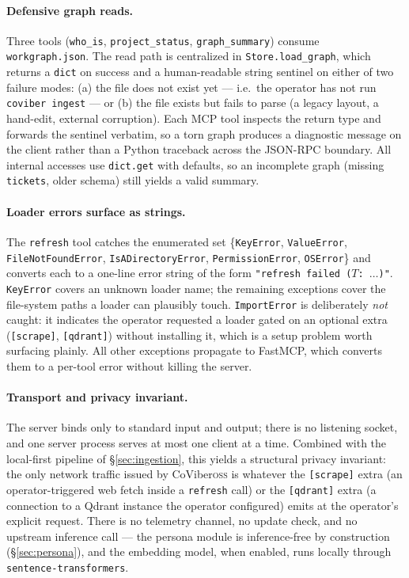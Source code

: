 \paragraph{Defensive graph reads.}
Three tools (\texttt{who\_is}, \texttt{project\_status}, \texttt{graph\_summary}) consume \texttt{workgraph.json}. The read path is centralized in \texttt{Store.load\_graph}, which returns a \texttt{dict} on success and a human-readable string sentinel on either of two failure modes: (a) the file does not exist yet --- i.e.\ the operator has not run \texttt{coviber ingest} --- or (b) the file exists but fails to parse (a legacy layout, a hand-edit, external corruption). Each MCP tool inspects the return type and forwards the sentinel verbatim, so a torn graph produces a diagnostic message on the client rather than a Python traceback across the JSON-RPC boundary. All internal accesses use \texttt{dict.get} with defaults, so an incomplete graph (missing \texttt{tickets}, older schema) still yields a valid summary.

\paragraph{Loader errors surface as strings.}
The \texttt{refresh} tool catches the enumerated set \{\texttt{KeyError}, \texttt{ValueError}, \texttt{FileNotFoundError}, \texttt{IsADirectoryError}, \texttt{PermissionError}, \texttt{OSError}\} and converts each to a one-line error string of the form \texttt{"refresh failed ($T$: $\dots$)"}. \texttt{KeyError} covers an unknown loader name; the remaining exceptions cover the file-system paths a loader can plausibly touch. \texttt{ImportError} is deliberately \emph{not} caught: it indicates the operator requested a loader gated on an optional extra (\texttt{[scrape]}, \texttt{[qdrant]}) without installing it, which is a setup problem worth surfacing plainly. All other exceptions propagate to FastMCP, which converts them to a per-tool error without killing the server.

\paragraph{Transport and privacy invariant.}
The server binds only to standard input and output; there is no listening socket, and one server process serves at most one client at a time. Combined with the local-first pipeline of \S\ref{sec:ingestion}, this yields a structural privacy invariant: the only network traffic issued by CoViber\Hyphdash{}\textsc{oss} is whatever the \texttt{[scrape]} extra (an operator-triggered web fetch inside a \texttt{refresh} call) or the \texttt{[qdrant]} extra (a connection to a Qdrant instance the operator configured) emits at the operator's explicit request. There is no telemetry channel, no update check, and no upstream inference call --- the persona module is inference-free by construction (\S\ref{sec:persona}), and the embedding model, when enabled, runs locally through \texttt{sentence-transformers}.

